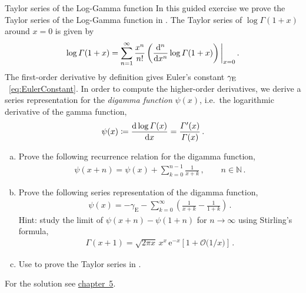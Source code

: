 \begin{exer}{Taylor series of the Log-Gamma function}
\label{Ex:TaylorLogGamma}
%
In this guided exercise we prove the Taylor series of the Log-Gamma function in . 
The Taylor series of $\log \Gamma(1+x)$ around $x=0$ is given by
\begin{align} \label{eq:loggammataylorgen}
\log \Gamma(1+x) = \sum_{n=1}^{\infty} \frac{x^n}{n!} \left( \frac{\d^n}{\d x^n} \log \Gamma(1+x) \right)\biggl|_{x=0} \,.
\end{align}
The first-order derivative by definition gives Euler's constant $\gamma_{\text{E}}$~\eqref{eq:EulerConstant}.
In order to compute the higher-order derivatives, we derive a series representation for the \emph{digamma function} $\psi(x)$, i.e.\ the logarithmic derivative of the gamma function,
\begin{align} \label{eq:psidef}
\psi(x) \coloneqq \frac{\d \log \Gamma(x)}{\d x} = \frac{\Gamma'(x)}{\Gamma(x)} \,.
\end{align}

\begin{enumerate}[a)]

\item Prove the following recurrence relation for the digamma function,
\begin{align} \label{eq:psixn}
\psi(x+n) = \psi(x) + \sum_{k=0}^{n-1} \frac{1}{x+k} \,, \qquad n \in \mathbb{N}\,.
\end{align}

\item Prove the following series representation of the digamma function,
\begin{align} \label{eq:psiseries}
\psi(x) = - \gamma_{\text{E}} - \sum_{k=0}^{\infty} \left(\frac{1}{x+k}-\frac{1}{1+k} \right) \,.
\end{align}
Hint: study the limit of $\psi(x+n)-\psi(1+n)$ for $n\to \infty$ using Stirling's formula,
\begin{align} \label{eq:stirling}
\Gamma(x+1) = \sqrt{2 \pi x} \, x^x \, \text{e}^{-x} \left[1 + \mathcal{O}\bigl(1/x\bigr) \right] \,.
\end{align}

\item Use  to prove the Taylor series in .

\end{enumerate}
For the solution see \hyperref[Sol:TaylorLogGamma]{chapter~5}.
\end{exer}





